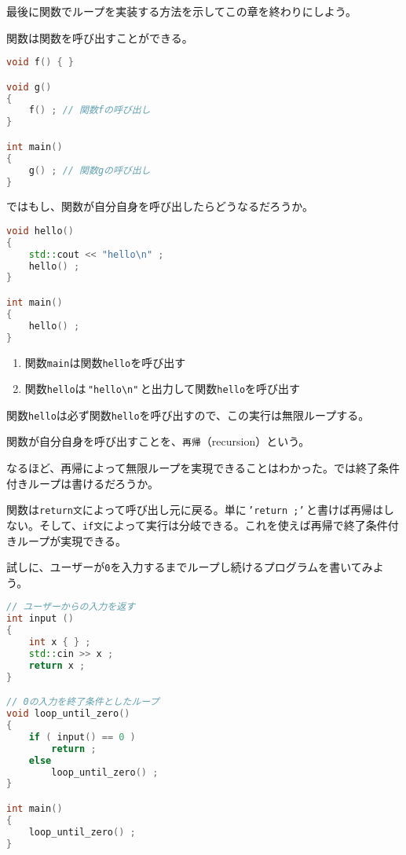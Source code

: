 
最後に関数でループを実装する方法を示してこの章を終わりにしよう。

関数は関数を呼び出すことができる。

\begin{lstlisting}[language={C++}]
void f() { }

void g()
{
    f() ; // 関数fの呼び出し
}

int main()
{
    g() ; // 関数gの呼び出し
}
\end{lstlisting}

ではもし、関数が自分自身を呼び出したらどうなるだろうか。

\begin{lstlisting}[language={C++}]
void hello()
{
    std::cout << "hello\n" ;
    hello() ;
}

int main()
{
    hello() ;
}
\end{lstlisting}

\begin{enumerate}
\def\labelenumi{\arabic{enumi}.}
\item
  関数\texttt{main}は関数\texttt{hello}を呼び出す
\item
  関数\texttt{hello}は\,\texttt{"hello{\textbackslash}n"}\,と出力して関数\texttt{hello}を呼び出す
\end{enumerate}

関数\texttt{hello}は必ず関数\texttt{hello}を呼び出すので、この実行は無限ループする。

関数が自分自身を呼び出すことを、\texttt{再帰}（recursion）という。

なるほど、再帰によって無限ループを実現できることはわかった。では終了条件付きループは書けるだろうか。

関数は\texttt{return文}によって呼び出し元に戻る。単に\,\texttt{'return ;'}\,と書けば再帰はしない。そして、\texttt{if文}によって実行は分岐できる。これを使えば再帰で終了条件付きループが実現できる。

試しに、ユーザーが\texttt{0}を入力するまでループし続けるプログラムを書いてみよう。

\ifTombow\pagebreak\fi
\begin{lstlisting}[language={C++}]
// ユーザーからの入力を返す
int input ()
{
    int x { } ;
    std::cin >> x ;
    return x ;
}

// 0の入力を終了条件としたループ
void loop_until_zero()
{
    if ( input() == 0 )
        return ;
    else
        loop_until_zero() ;
}

int main()
{
    loop_until_zero() ;
}
\end{lstlisting}

